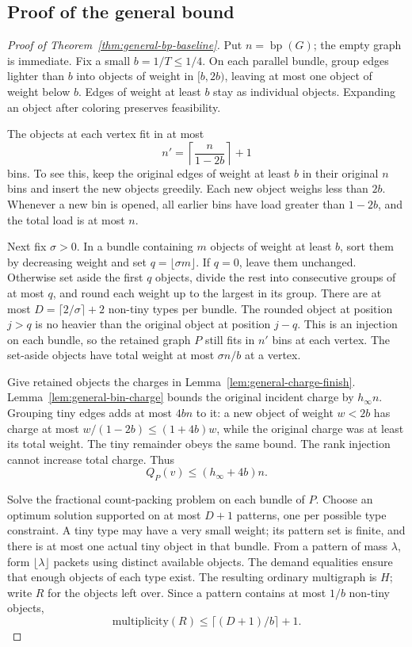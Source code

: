 \documentclass[11pt]{article}
\theoremstyle{definition}\newtheorem{algorithm}{Algorithm}[section]
\numberwithin{equation}{section}
\theoremstyle{remark}\newtheorem*{remark}{Remark}
\newcommand{\bp}{\operatorname{bp}}
\begin{document}
\subsection{Proof of the general bound}
\begin{proof}[Proof of Theorem~\ref{thm:general-bp-baseline}]
Put $n=\bp(G)$; the empty graph is immediate. Fix a small
$b=1/T\le1/4$. On each parallel bundle, group edges lighter than $b$
into objects of weight in $[b,2b)$, leaving at most one object of weight
below $b$. Edges of weight at least $b$ stay as individual objects.
Expanding an object after coloring preserves feasibility.

The objects at each vertex fit in at most
\[
 n'=\left\lceil\frac{n}{1-2b}\right\rceil+1
\]
bins. To see this, keep the original edges of weight at least $b$ in
their original $n$ bins and insert the new objects greedily. Each new
object weighs less than $2b$. Whenever a new bin is opened, all earlier
bins have load greater than $1-2b$, and the total load is at most $n$.

Next fix $\sigma>0$. In a bundle containing $m$ objects of weight at
least $b$, sort them by decreasing weight and set $q=\lfloor\sigma m\rfloor$.
If $q=0$, leave them unchanged. Otherwise set aside the first $q$
objects, divide the rest into consecutive groups of at most $q$, and
round each weight up to the largest in its group. There are at most
$D=\lceil2/\sigma\rceil+2$ non-tiny types per bundle. The rounded
object at position $j>q$ is no heavier than the original object at
position $j-q$. This is an injection on each bundle, so the retained
graph $P$ still fits in $n'$ bins at each vertex. The set-aside objects
have total weight at most $\sigma n/b$ at a vertex.

Give retained objects the charges in
Lemma~\ref{lem:general-charge-finish}. Lemma~\ref{lem:general-bin-charge}
bounds the original incident charge by $h_\infty n$. Grouping tiny
edges adds at most $4bn$ to it: a new object of weight $w<2b$ has
charge at most $w/(1-2b)\le(1+4b)w$, while the original charge was
at least its total weight. The tiny remainder obeys the same bound.
The rank injection cannot increase total charge. Thus
\begin{equation}\label{eq:general-charge-budget}
 Q_P(v)\le(h_\infty+4b)n.
\end{equation}

Solve the fractional count-packing problem on each bundle of $P$.
Choose an optimum solution supported on at most $D+1$ patterns, one
per possible type constraint. A tiny type may have a very small
weight; its pattern set is finite, and there is at most one actual
tiny object in that bundle. From a pattern of mass $\lambda$, form
$\lfloor\lambda\rfloor$ packets using distinct available objects.
The demand equalities ensure that enough objects of each type exist.
The resulting ordinary multigraph is $H$; write $R$ for the objects
left over. Since a pattern contains at most $1/b$ non-tiny objects,
\[
 \text{multiplicity}(R)\le\lceil(D+1)/b\rceil+1.
\]


\end{proof}
\end{document}
